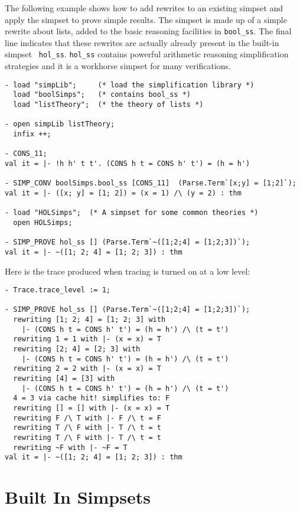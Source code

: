 The following example shows how to add rewrites to an existing simpset
and apply the simpset to prove simple results.  The simpset is made up
of a simple rewrite about lists, added to the basic reasoning
facilities in {\tt bool\_ss}.  The final line indicates that these
rewrites are actually already present in the built-in simpset {\tt
hol\_ss}.  {\tt hol\_ss} contains powerful arithmetic reasoning
simplification strategies and it is a workhorse simpset for many
verifications. 
\begin{boxed} \begin{verbatim}
- load "simpLib";     (* load the simplification library *)
  load "boolSimps";   (* contains bool_ss *)
  load "listTheory";  (* the theory of lists *)

- open simpLib listTheory;
  infix ++;

- CONS_11;
val it = |- !h h' t t'. (CONS h t = CONS h' t') = (h = h')

- SIMP_CONV boolSimps.bool_ss [CONS_11]  (Parse.Term`[x;y] = [1;2]`);
val it = |- ([x; y] = [1; 2]) = (x = 1) /\ (y = 2) : thm

- load "HOLSimps";  (* A simpset for some common theories *)
  open HOLSimps;

- SIMP_PROVE hol_ss [] (Parse.Term`~([1;2;4] = [1;2;3])`);
val it = |- ~([1; 2; 4] = [1; 2; 3]) : thm
\end{verbatim} \end{boxed}
Here is the trace produced when tracing is turned on at a low level:
\begin{boxed} \begin{verbatim}
- Trace.trace_level := 1;

- SIMP_PROVE hol_ss [] (Parse.Term`~([1;2;4] = [1;2;3])`);
  rewriting [1; 2; 4] = [1; 2; 3] with
    |- (CONS h t = CONS h' t') = (h = h') /\ (t = t')
  rewriting 1 = 1 with |- (x = x) = T
  rewriting [2; 4] = [2; 3] with
    |- (CONS h t = CONS h' t') = (h = h') /\ (t = t')
  rewriting 2 = 2 with |- (x = x) = T
  rewriting [4] = [3] with
    |- (CONS h t = CONS h' t') = (h = h') /\ (t = t')
  4 = 3 via cache hit! simplifies to: F
  rewriting [] = [] with |- (x = x) = T
  rewriting F /\ T with |- F /\ t = F
  rewriting T /\ F with |- T /\ t = t
  rewriting T /\ F with |- T /\ t = t
  rewriting ~F with |- ~F = T
val it = |- ~([1; 2; 4] = [1; 2; 3]) : thm
\end{verbatim} \end{boxed}


\section{Built In Simpsets}


